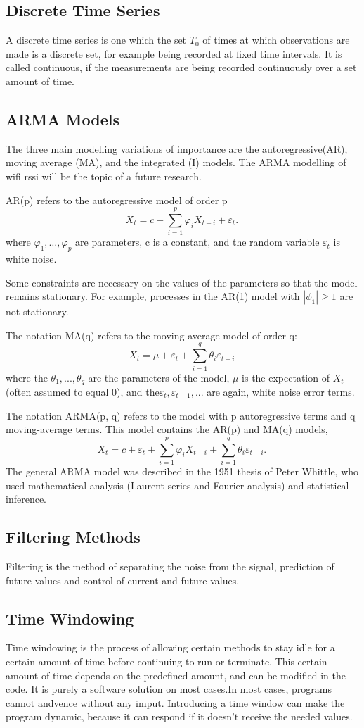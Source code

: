 \subsection{Discrete Time Series}
A discrete time series is one which the set $T_0$ of times at which observations are made is a discrete set, for example being recorded at fixed time intervals. It is called continuous, if the measurements are being recorded continuously over a set amount of time.
\subsection{ARMA Models}
The three main modelling variations of importance are the autoregressive(AR),
moving average (MA), and the integrated (I) models. The ARMA modelling of wifi rssi will be the topic of a future research.


AR(p) refers to the autoregressive model of order p
$$ 
X_t = c + \sum_{i=1}^p \varphi_i X_{t-i}+ \varepsilon_t .\, 
$$
where $\varphi_1, \ldots, \varphi_p$ are parameters, c is a constant, and the random variable $\varepsilon_t$ is white noise.

Some constraints are necessary on the values of the parameters so that the model remains stationary. For example, processes in the AR(1) model with $|\phi_1| \geq 1$ are not stationary.

The notation MA(q) refers to the moving average model of order q:
$$
X_t = \mu + \varepsilon_t + \sum_{i=1}^q \theta_i \varepsilon_{t-i}\,
$$
where the $\theta_1, ..., \theta_q$ are the parameters of the model, $\mu$ is the expectation of $X_t$ (often assumed to equal 0), and the$ \varepsilon_t, \varepsilon_{t-1},...$ are again, white noise error terms.


The notation ARMA(p, q) refers to the model with p autoregressive terms and q moving-average terms. This model contains the AR(p) and MA(q) models,
$$
X_t = c + \varepsilon_t + \sum_{i=1}^p \varphi_i X_{t-i} + \sum_{i=1}^q \theta_i \varepsilon_{t-i}.\,
$$
The general ARMA model was described in the 1951 thesis of Peter Whittle, who used mathematical analysis (Laurent series and Fourier analysis) and statistical inference.


\subsection{Filtering Methods}
Filtering is the method of separating the noise from the signal, prediction of future values and control of current and future values.


\subsection{Time Windowing}
Time windowing is the process of allowing certain methods to stay idle for a certain amount of time before continuing to run or terminate. This certain amount of time depends on the predefined amount, and can be modified in the code. It is purely a software solution on most cases.In most cases, programs cannot andvence without any imput. Introducing a time window can make the program dynamic, because it can respond if it doesn't receive the needed values.

